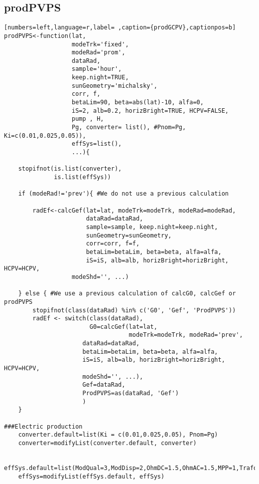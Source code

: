 \subsection{prodPVPS}
\label{sec:orga637de0}
\begin{lstlisting}[numbers=left,language=r,label= ,caption={prodGCPV},captionpos=b]
prodPVPS<-function(lat, 
                   modeTrk='fixed', 
                   modeRad='prom', 
                   dataRad,
                   sample='hour',
                   keep.night=TRUE,
                   sunGeometry='michalsky',
                   corr, f,
                   betaLim=90, beta=abs(lat)-10, alfa=0,
                   iS=2, alb=0.2, horizBright=TRUE, HCPV=FALSE,
                   pump , H, 
                   Pg, converter= list(), #Pnom=Pg, Ki=c(0.01,0.025,0.05)),
                   effSys=list(),
                   ...){

    stopifnot(is.list(converter),
              is.list(effSys))

    if (modeRad!='prev'){ #We do not use a previous calculation

        radEf<-calcGef(lat=lat, modeTrk=modeTrk, modeRad=modeRad,
                       dataRad=dataRad,
                       sample=sample, keep.night=keep.night,
                       sunGeometry=sunGeometry,
                       corr=corr, f=f,
                       betaLim=betaLim, beta=beta, alfa=alfa,
                       iS=iS, alb=alb, horizBright=horizBright, HCPV=HCPV,
                   modeShd='', ...)

    } else { #We use a previous calculation of calcG0, calcGef or prodPVPS
        stopifnot(class(dataRad) %in% c('G0', 'Gef', 'ProdPVPS'))
        radEf <- switch(class(dataRad),
                        G0=calcGef(lat=lat, 
                                   modeTrk=modeTrk, modeRad='prev',
                      dataRad=dataRad,
                      betaLim=betaLim, beta=beta, alfa=alfa,
                      iS=iS, alb=alb, horizBright=horizBright, HCPV=HCPV,
                      modeShd='', ...),
                      Gef=dataRad,
                      ProdPVPS=as(dataRad, 'Gef')
                      )
    }

###Electric production
    converter.default=list(Ki = c(0.01,0.025,0.05), Pnom=Pg)
    converter=modifyList(converter.default, converter)

    effSys.default=list(ModQual=3,ModDisp=2,OhmDC=1.5,OhmAC=1.5,MPP=1,TrafoMT=1,Disp=0.5)
    effSys=modifyList(effSys.default, effSys)


\end{lstlisting}
